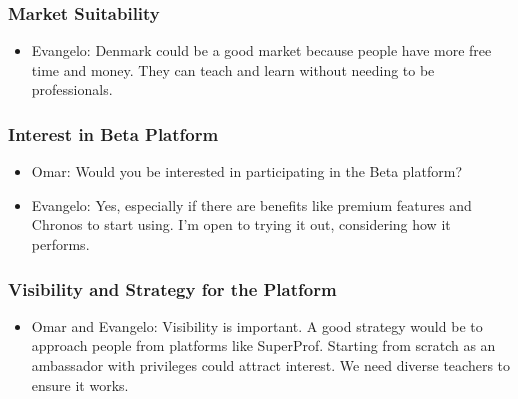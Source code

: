 \subsubsection*{Market Suitability}
\begin{itemize}
\item Evangelo: Denmark could be a good market because people have more free time and money. They can teach and learn without needing to be professionals.
\end{itemize}

\subsubsection*{Interest in Beta Platform}
\begin{itemize}
\item Omar: Would you be interested in participating in the Beta platform?
\item Evangelo: Yes, especially if there are benefits like premium features and Chronos to start using. I’m open to trying it out, considering how it performs.
\end{itemize}

\subsubsection*{Visibility and Strategy for the Platform}
\begin{itemize}
\item Omar and Evangelo: Visibility is important. A good strategy would be to approach people from platforms like SuperProf. Starting from scratch as an ambassador with privileges could attract interest. We need diverse teachers to ensure it works.
\end{itemize}